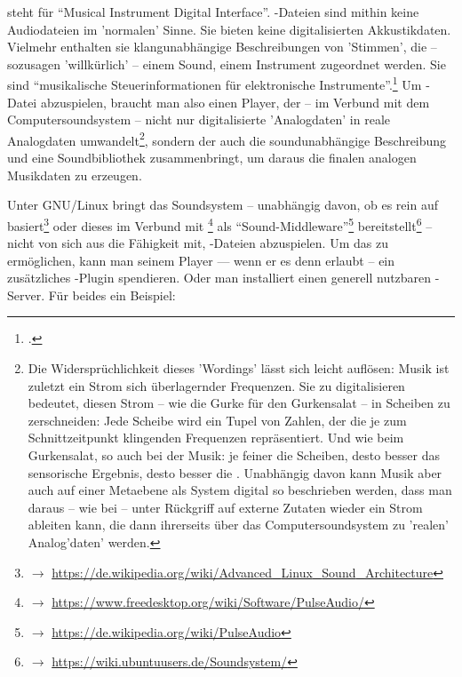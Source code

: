  steht für \enquote{Musical Instrument Digital Interface}.
-Dateien sind mithin keine Audiodateien im 'normalen' Sinne. Sie
bieten keine digitalisierten Akkustikdaten. Vielmehr enthalten sie
klangunabhängige Beschreibungen von 'Stimmen', die -- sozusagen 'willkürlich' --
einem Sound, einem Instrument zugeordnet werden. Sie sind \enquote{musikalische
Steuerinformationen für elektronische Instrumente}.\footcite[vgl. dazu][\nopage
wp.]{WpedMidi2019a} Um -Datei abzuspielen, braucht man also einen
Player, der -- im Verbund mit dem Computersoundsystem -- nicht nur
digitalisierte 'Analogdaten' in reale Analogdaten umwandelt\footnote{Die
Widersprüchlichkeit dieses 'Wordings' lässt sich leicht auflösen:
Musik ist zuletzt ein Strom sich überlagernder Frequenzen. Sie zu digitalisieren
bedeutet, diesen Strom -- wie die Gurke für den Gurkensalat -- in Scheiben zu
zerschneiden: Jede Scheibe wird ein Tupel von Zahlen, der die je zum
Schnittzeitpunkt klingenden Frequenzen repräsentiert. Und wie beim Gurkensalat,
so auch bei der Musik: je feiner die Scheiben, desto besser das sensorische
Ergebnis, desto besser die . Unabhängig davon
kann Musik aber auch auf einer Metaebene als System digital so beschrieben
werden, dass man daraus -- wie bei  -- unter Rückgriff auf externe
Zutaten wieder ein Strom  ableiten kann, die
dann ihrerseits über das Computersoundsystem zu 'realen' Analog'daten' werden.},
sondern der auch die soundunabhängige Beschreibung und eine Soundbibliothek
zusammenbringt, um daraus die finalen analogen Musikdaten zu erzeugen.

Unter GNU/Linux bringt das Soundsystem -- unabhängig davon, ob es rein auf
 basiert\footnote{$\rightarrow$
\href{https://de.wikipedia.org/wiki/Advanced{\_}Linux{\_}Sound{\_}Architecture}
{https://de.wikipedia.org/wiki/Advanced{\_}Linux{\_}Sound{\_}Architecture}} oder
dieses im Verbund mit \footnote{$\rightarrow$
\href{https://www.freedesktop.org/wiki/Software/PulseAudio/}
{https://www.freedesktop.org/wiki/Software/PulseAudio/}} als
\enquote{Sound-Middleware}\footnote{$\rightarrow$
\href{https://de.wikipedia.org/wiki/PulseAudio}
{https://de.wikipedia.org/wiki/PulseAudio}} bereitstellt\footnote{$\rightarrow$
\href{https://wiki.ubuntuusers.de/Soundsystem/}{https://wiki.ubuntuusers.de/Soundsystem/}}
-- nicht von sich aus die Fähigkeit mit, -Dateien abzuspielen.
Um das zu ermöglichen, kann man seinem Player --- wenn er es denn erlaubt -- ein
zusätzliches -Plugin spendieren. Oder man installiert einen generell
nutzbaren -Server. Für beides ein Beispiel:

